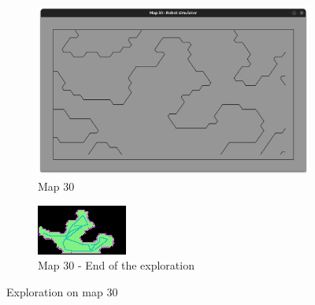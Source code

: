 \documentclass[../main.tex]{subfiles}
\begin{document}
\begin{figure}[H]
	\centering
	\begin{subfigure}{0.45\textwidth}
		\centering
		\includegraphics[width=\textwidth]{IMAGES/part5/map30.png}
		\caption{Map 30}
	\end{subfigure}
	\hfill
	\begin{subfigure}{0.45\textwidth}
		\centering
		\includegraphics[width=\textwidth]{IMAGES/part5/map30_explored_1robot.png}
		\caption{Map 30 - End of the exploration}
	\end{subfigure}
	\caption{Exploration on map 30}
	\label{fig:explo_30}
\end{figure}
\end{document}

